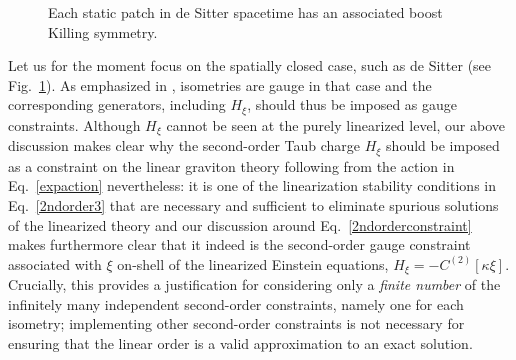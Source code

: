 \documentclass[]{jkpaper}
\theoremstyle{plain}
\theoremstyle{definition}
\begin{document}
\begin{figure}
    \centering
    \caption{Each static patch in de Sitter spacetime has an associated boost Killing symmetry.}
    \label{Figure: de Sitter boost}
\end{figure}

Let us for the moment focus on the spatially closed case, such as de Sitter (see Fig.~\ref{Figure: de Sitter boost}). As emphasized in \cite{Chandrasekaran:2022cip}, isometries are gauge in that case and the corresponding generators, including $H_\xi$, should thus be imposed as gauge constraints. Although $H_\xi$ cannot be seen at the purely linearized level, our above discussion makes clear why the second-order Taub charge $H_\xi$ should be imposed as a constraint on the linear graviton theory following from the action in Eq.~\eqref{expaction} nevertheless: it is one of the linearization stability conditions in Eq.~\eqref{2ndorder3} that are necessary and sufficient to eliminate spurious solutions of the linearized theory and our discussion around Eq.~\eqref{2ndorderconstraint} makes furthermore clear that it indeed is the second-order gauge constraint associated with $\xi$ on-shell of the linearized Einstein equations, $H_\xi=-C^{(2)}[\kappa\xi]$. Crucially, this provides a justification for considering only a \emph{finite number} of the infinitely many independent second-order constraints, namely one for each isometry; implementing other second-order constraints is not necessary for ensuring that the linear order is a valid approximation to an exact solution. 
\end{document}
